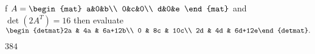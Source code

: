 
\begin{Exercise}[
name={},
title={}, 
difficulty=0,
origin={\cite{YL}}]
f
$
A=\begin{mat}
a&0&b\\
0&c&0\\
d&0&e
\end{mat}
$
and $\det(2A^T)=16$ then evaluate
$
\begin{detmat}2a & 4a & 6a+12b\\ 0 & 8c & 10c\\ 2d & 4d & 6d+12e\end{detmat}.
$
\end{Exercise}

\begin{Answer}
$
384
$
\end{Answer}
